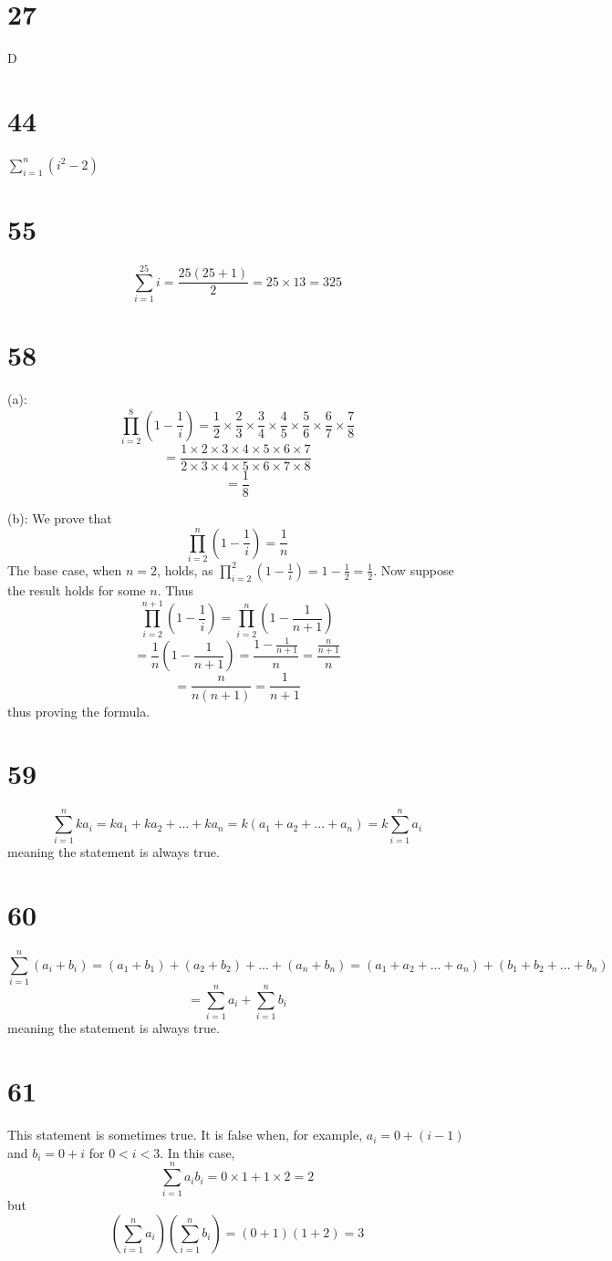 \documentclass{article}
\theoremstyle{definition}
\newcommand{\?}{\stackrel{?}{=}}
\begin{document}
\section*{27}
D

\section*{44}
$\sum_{i=1}^n(i^2-2)$

\section*{55}
\[ \sum_{i=1}^{25}i=\frac{25(25+1)}{2}=25\times 13=325 \]

\section*{58}
(a): \[ \prod_{i=2}^8(1-\frac{1}{i})=\frac{1}{2}\times\frac{2}{3}\times\frac{3}{4}\times\frac{4}{5}\times\frac{5}{6}\times\frac{6}{7}\times\frac{7}{8} \]
\[ =\frac{1\times 2\times 3\times 4\times 5\times 6\times 7}{2\times 3\times 4\times 5\times 6\times 7\times 8} \]
\[ =\frac{1}{8} \]


(b): We prove that \[ \prod_{i=2}^n(1-\frac{1}{i})=\frac{1}{n} \] The base case, when $n=2$, holds, as
$\prod_{i=2}^2(1-\frac{1}{i})=1-\frac{1}{2}=\frac{1}{2}$. Now suppose the result holds for some $n$.
Thus \[ \prod_{i=2}^{n+1}(1-\frac{1}{i})=\prod_{i=2}^n(1-\frac{1}{n+1}) \]
\[ =\frac{1}{n}(1-\frac{1}{n+1})=\dfrac{1-\frac{1}{n+1}}{n}=\dfrac{\frac{n}{n+1}}{n} \]
\[ =\frac{n}{n(n+1)}=\frac{1}{n+1} \] thus proving the formula.

\section*{59}
\[ \sum_{i=1}^nka_i=ka_1+ka_2+...+ka_n=k(a_1+a_2+...+a_n)=k\sum_{i=1}^na_i \] meaning the statement is always true.

\section*{60}
\[ \sum_{i=1}^n(a_i+b_i)=(a_1+b_1)+(a_2+b_2)+...+(a_n+b_n)=(a_1+a_2+...+a_n)+(b_1+b_2+...+b_n) \]
\[ =\sum_{i=1}^na_i+\sum_{i=1}^nb_i \] meaning the statement is always true.

\section*{61}
This statement is sometimes true. It is false when, for example, $a_i=0+(i-1)$ and $b_i=0+i$ for $0<i<3$. In this case, 
\[ \sum_{i=1}^na_ib_i=0\times 1+1\times 2=2 \] but 
\[ (\sum_{i=1}^na_i)(\sum_{i=1}^nb_i)=(0+1)(1+2)=3 \]
\end{document}
